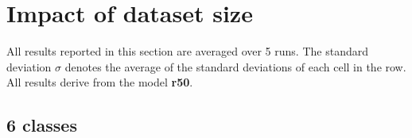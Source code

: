 \documentclass[oneside, english, bibtex]{kththesis}
\begin{document}
\clearpage

\section{Impact of dataset size}

All results reported in this section are averaged over 5 runs. The standard deviation $\sigma$ denotes the average of the standard deviations of each cell in the row. All results derive from the model \textbf{r50}.

\subsection{6 classes}


\begin{table}[H]
  \begin{center}
    \caption{Gradually increasing dataset size - 6 classes - In-set ()}
    \label{tab:dsizeallcinset}
  \end{center}
\end{table}
\end{document}
